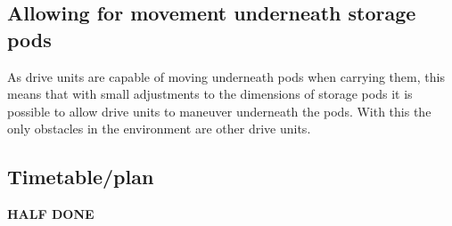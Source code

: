 \documentclass[a4paper,11pt]{article}
\begin{document}

\subsection{Allowing for movement underneath storage pods}
As drive units are capable of moving underneath pods when carrying them, this means that with small adjustments to the dimensions of storage pods it is possible to allow drive units to maneuver underneath the pods. With this the only obstacles in the environment are other drive units.

\subsection{Timetable/plan}
\textbf{HALF DONE}
\end{document}
